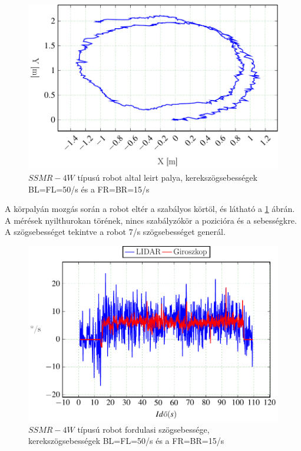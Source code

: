 \begin{figure}[H]
  \includegraphics{tikz/KorP0705b.pdf}
  \caption{$SSMR-4W$ típusú robot altal leirt palya, kerekszögsebességek BL=FL=50\degree/s és a FR=BR=15\degree/s}
  \label{fig:KorP0705b}
\end{figure}

A körpalyán mozgás során a robot eltér a szabályos körtöl, és  látható a \ref{fig:KorP0705b} ábrán. A mérések nyilthurokan törének, nincs szabályzókör a pozicióra és a sebességkre.
A szögsebességet tekintve a robot 7\degree/s szögsebességet generál.




\begin{figure}[H]
\begin{center}
  \includegraphics[scale=0.8]{tikz/KorP0705d.pdf}
\end{center}
  \caption{$SSMR-4W$ típusú robot fordulasi szögsebessége, kerekszögsebességek BL=FL=50\degree/s és a FR=BR=15\degree/s}
  \label{fig:KorP0705d}
\end{figure}


